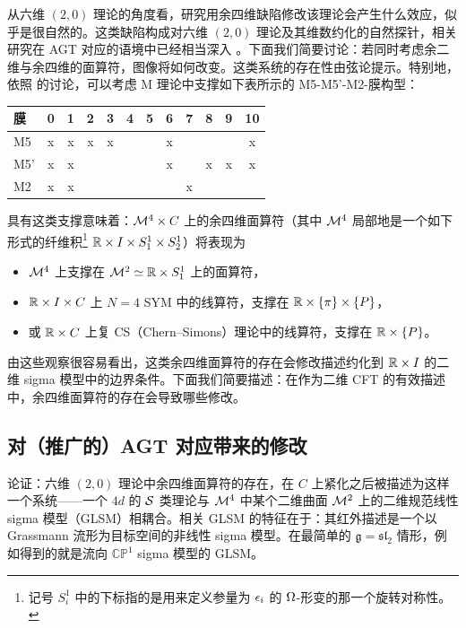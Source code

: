 从六维 $(2,0)$ 理论的角度看，研究用余四维缺陷修改该理论会产生什么效应，似乎是很自然的。这类缺陷构成对六维 $(2,0)$ 理论及其维数约化的自然探针，相关研究在 AGT 对应的语境中已经相当深入 \cite{AGGTV}。下面我们简要讨论：若同时考虑余二维与余四维的面算符，图像将如何改变。这类系统的存在性由弦论提示。特别地，依照 \cite{FGT} 的讨论，可以考虑 M 理论中支撑如下表所示的 M5-M5'-M2-膜构型：
\begin{center}
\begin{tabular}{l || c|c|c|c|c|c|c|c|c|c|c}
膜 & 0 & 1 & 2 & 3 & 4 & 5 & 6 & 7 & 8 & 9 & 10 \\ \hline\hline
M5  & x & x & x & x &   &   & x &   &   &   & x  \\
M5' & x & x &   &   &   &   & x &   & x & x & x \\
M2  & x & x &   &   &   &   &  &  x &   &   &   \\
\end{tabular}
\end{center}
具有这类支撑意味着：$\mathcal{M}^4\times C$ 上的余四维面算符（其中 $\mathcal{M}^4$ 局部地是一个如下形式的纤维积\footnote{记号 
$S_i^1$ 中的下标指的是用来定义参量为 $\epsilon_i$ 的 $\Omega$-形变的那一个旋转对称性。} $\mathbb{R}\times I\times
S^1_1\times S^1_2$）将表现为
\begin{itemize}
\item
$\mathcal{M}^4$ 上支撑在 $\mathcal{M}^2\simeq \mathbb{R}\times S_{1}^1$ 上的面算符，
\item
$\mathbb{R}\times I\times C$ 上 $N=4$ SYM 中的线算符，支撑在 $\mathbb{R}\times \{\pi\}\times \{P\}$，
\item
或 $\mathbb{R}\times C$ 上复 {\crd CS}（Chern--Simons）理论中的线算符，支撑在 $\mathbb{R}\times \{P\}$。
\end{itemize}
由这些观察很容易看出，这类余四维面算符的存在会修改描述约化到 $\mathbb{R}\times I$ 的二维 sigma 模型中的边界条件。下面我们简要描述：在作为二维 CFT 的有效描述中，余四维面算符的存在会导致哪些修改。

\subsection{对（推广的）AGT 对应带来的修改}

\cite{AGGTV} 论证：六维 $(2,0)$ 理论中余四维面算符的存在，在 $C$ 上紧化之后被描述为这样一个系统——一个 $4d$ 的 $\mathcal{S}$ 类理论与 $\mathcal{M}^4$ 中某个二维曲面 $\mathcal{M}^2$ 上的二维规范线性 sigma 模型（GLSM）相耦合。相关 GLSM 的特征在于：其红外描述是一个以 Grassmann 流形为目标空间的非线性 sigma 模型。在最简单的 $\mathfrak{g}= \mathfrak{sl}_2$ 情形，例如得到的就是流向 $\mathbb{CP}^1$ sigma 模型的 GLSM。


